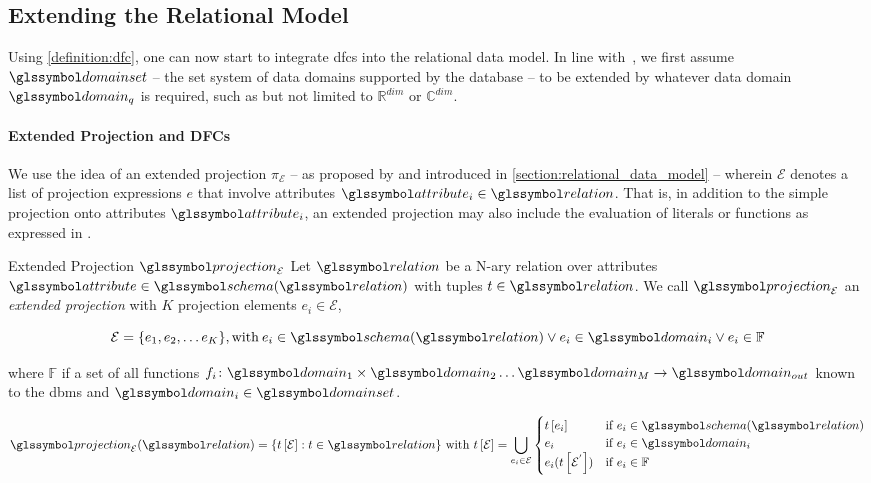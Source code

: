 \subsection{Extending the Relational Model}

Using \cref{definition:dfc}, one can now start to integrate \acrshort{dfc}s into the relational data model. In line with~\cite{Giangreco:2018thesis}, we first assume $\domainset$ -- the set system of data domains supported by the database -- to be extended by whatever data domain $\domain_q$ is required, such as but not limited to $\mathbb{R}^{dim}$ or $\mathbb{C}^{dim}$. 

\paragraph{Extended Projection and DFCs}

We use the idea of an extended projection $\pi_{\mathcal{E}}$ -- as proposed by \cite{Gupta:1995Generalized,Garcia:2009Database} and introduced in \cref{section:relational_data_model} -- wherein $\mathcal{E}$ denotes a list of projection expressions $e$ that involve attributes $\attribute_i \in \relation$. That is, in addition to the simple projection onto attributes $\attribute_i$, an extended projection may also include the evaluation of literals or functions as expressed in . 

\begin{definition}[label=definition:extended_projection]{Extended Projection $\projection_\mathcal{E}$}{}
Let $\relation$ be a N-ary relation over attributes $\attribute \in \schema (\relation)$ with tuples $t \in \relation$. We call $\projection_\mathcal{E}$ an \emph{extended projection} with $K$ projection elements $e_i \in \mathcal{E}$,

\begin{equation*}
    \mathcal{E} = \{ e_1, e_2, \ldots e_K \}, \textrm{with} \: e_i \in \schema(\relation) \vee e_i \in \domain_i \vee e_i \in \mathbb{F}
\end{equation*}

where $\mathbb{F}$ if a set of all functions $f_i \colon \domain_{1} \times \domain_{2} \ldots \domain_{M} \rightarrow \domain_{out}$ known to the \acrshort{dbms} and $\domain_i \in \domainset$.

\begin{equation*}
    \projection_{\mathcal{E}}(\relation) =  \{ t\left[ \mathcal{E} \right] : t \in \relation \} \textrm{ with } t\left[ \mathcal{E} \right] = \bigcup_{e_i \in \mathcal{E}}
    \begin{cases} 
        t \left[ e_i \right] & \text{if } e_i \in \schema(\relation) \\
        e_i  & \text{if } e_i \in \domain_i \\
        e_i(t \left[ \mathcal{E}^{'} \right]) & \text{if } e_i \in \mathbb{F} \\
    \end{cases}
\end{equation*}
\end{definition}

